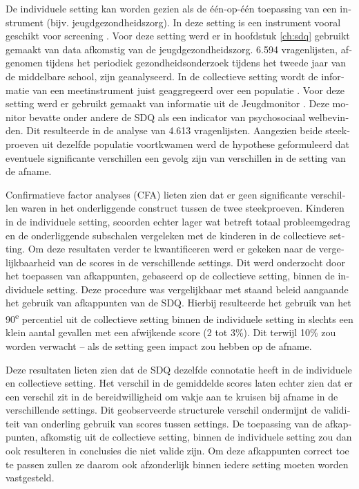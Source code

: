 \begin{otherlanguage}{dutch}
De individuele setting kan worden gezien als de \'e\'en-op-\'e\'en toepassing van een instrument (bijv. jeugdgezondheidszorg). In deze setting is een instrument vooral geschikt voor screening \parencite{Vogels_2009, Widenfelt_2003, Goodman_2001}. Voor deze setting werd er in hoofdstuk \ref{ch:sdq} gebruikt gemaakt van data afkomstig van de jeugdgezondheidszorg. 6.594 vragenlijsten, afgenomen tijdens het periodiek gezondheidsonderzoek tijdens het tweede jaar van de middelbare school, zijn geanalyseerd. In de collectieve setting wordt de informatie van een meetinstrument juist geaggregeerd over een populatie \parencite{Roy_2006,Becker_2006,Ravens_2008}. Voor deze setting werd er gebruikt gemaakt van informatie uit de Jeugdmonitor \parencite{Youth_2014a}. Deze monitor bevatte onder andere de SDQ als een indicator van psychosociaal welbevinden. Dit resulteerde in de analyse van 4.613 vragenlijsten. Aangezien beide steekproeven uit dezelfde populatie voortkwamen werd de hypothese geformuleerd dat eventuele significante verschillen een gevolg zijn van verschillen in de setting van de afname.

Confirmatieve factor analyses (CFA) lieten zien dat er geen significante verschillen waren in het onderliggende construct tussen de twee steekproeven. Kinderen in de individuele setting, scoorden echter lager wat betreft totaal probleemgedrag en de onderliggende subschalen vergeleken met de kinderen in de collectieve setting. Om deze resultaten verder te kwantificeren werd er gekeken naar de vergelijkbaarheid van de scores in de verschillende settings. Dit werd onderzocht door het toepassen van afkappunten, gebaseerd op de collectieve setting, binnen de individuele setting. Deze procedure was vergelijkbaar met staand beleid aangaande het gebruik van afkappunten van de SDQ. Hierbij resulteerde het gebruik van het 90\textsuperscript{e} percentiel uit de collectieve setting binnen de individuele setting in slechts een klein aantal gevallen met een afwijkende score (2 tot 3\%). Dit terwijl 10\% zou worden verwacht -- als de setting geen impact zou hebben op de afname. 

Deze resultaten lieten zien dat de SDQ dezelfde connotatie heeft in de individuele en collectieve setting. Het verschil in de gemiddelde scores laten echter zien dat er een verschil zit in de bereidwilligheid om vakje aan te kruisen bij afname in de verschillende settings. Dit geobserveerde structurele verschil ondermijnt de validiteit van onderling gebruik van scores tussen settings. De toepassing van de afkappunten, afkomstig uit de collectieve setting, binnen de individuele setting zou dan ook resulteren in conclusies die niet valide zijn. Om deze afkappunten correct toe te passen zullen ze daarom ook afzonderlijk binnen iedere setting moeten worden vastgesteld.


\end{otherlanguage}
